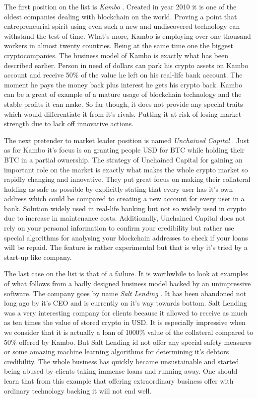 \documentclass[a4paper,12pt,twoside,openany]{report}
\begin{document}
The first position on the list is \textit{Kambo} \cite{kambo}. Created in year 2010 it is one of the oldest companies dealing with blockchain on the world. Proving a point that entrepreneurial spirit using even such a new and undiscovered technology can withstand the test of time. What's more, Kambo is employing over one thousand workers in almost twenty countries. Being at the same time one the biggest cryptocompanies. The business model of Kambo is exactly what has been described earlier. Person in need of dollars can park his crypto assets on Kambo account and receive 50\% of the value he left on his real-life bank account. The moment he pays the money back plus interest he gets his crypto back. Kambo can be a great of example of a mature usage of blockchain technology and the stable profits it can make. So far though, it does not provide any special traits which would differentiate it from it's rivals. Putting it at risk of losing market strength due to lack off innovative actions.

The next pretender to market leader position is named \textit{Unchained Capital} \cite{unchained}. Just as for Kambo it's focus is on granting people USD for BTC while holding their BTC in a partial ownership. The strategy of Unchained Capital for gaining an important role on the market is exactly what makes the whole crypto market so rapidly changing and innovative. They put great focus on making their collateral holding as safe as possible by explicitly stating that every user has it's own address which could be compared to creating a new account for every user in a bank. Solution widely used in real-life banking but not so widely used in crypto due to increase in maintenance costs. Additionally, Unchained Capital does not rely on your personal information to confirm your credibility but rather use special algorithms for analysing your blockchain addresses to check if your loans will be repaid. The feature is rather experimental but that is why it's tried by a start-up like company.

The last case on the list is that of a failure. It is worthwhile to look at examples of what follows from a badly designed business model backed by an unimpressive software. The company goes by name \textit{Salt Lending} \cite{saltlending}. It has been abandoned not long ago by it's CEO and is currently on it's way towards bottom. Salt Lending was a very interesting company for clients because it allowed to receive as much as ten times the value of stored crypto in USD. It is especially impressive when we consider that it is actually a loan of 1000\% value of the collateral compared to 50\% offered by Kambo. But Salt Lending id not offer any special safety measures or some amazing machine learning algorithms for determining it's debtors credibility. The whole business has quickly became unsustainable and started being abused by clients taking immense loans and running away. One should learn that from this example that offering extraordinary business offer with ordinary technology backing it will not end well.
\end{document}
